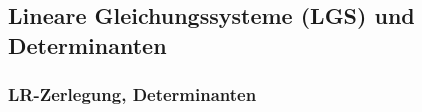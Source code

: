 
%


%
%
%

\subsection{Lineare Gleichungssysteme (LGS) und Determinanten}


%

\subsubsection{LR-Zerlegung, Determinanten}



